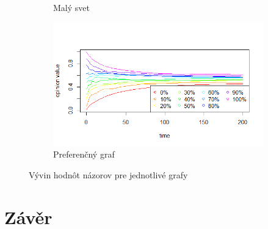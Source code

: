 \documentclass[10pt,a4paper]{report}
\begin{document}
\begin{figure}
\begin{subfigure}[b]{0.475\textwidth}
      \caption[]%
      {{\small Malý svet}}    
      \label{fig:mean and std of net34}
  \end{subfigure}
  \quad
  \begin{subfigure}[b]{0.475\textwidth}   
      \centering 
      \includegraphics[width=\textwidth]{plots/max-values/prefferentialMaxV.png}
      \caption[]%
      {{\small Preferenčný graf}}    
      \label{fig:mean and std of net44}
  \end{subfigure}
  \caption[ Vývin zmien pre jednotlivé grafy ]
  {\small Vývin hodnôt názorov pre jednotlivé grafy}
  \label{fig:mean and std of nets}
\end{figure}
 
\chapter{Závěr}
\end{document}
